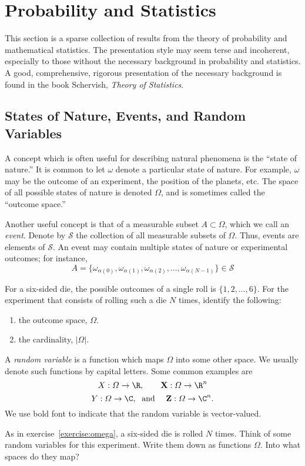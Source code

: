 \section{Probability and Statistics}
This section is a sparse collection of results from the
theory of probability and mathematical statistics.  The
presentation style may seem terse and incoherent, especially
to those without the necessary background in probability and
statistics.  A good, comprehensive, rigorous presentation of
the necessary background is found in the book
\cite{Schervish:1995} Schervish, {\it Theory of Statistics}.

\subsection{States of Nature, Events, and Random Variables}
A concept which is often useful for describing natural phenomena is the
``state of nature.''  It is common to let $\omega$ denote a
particular state of nature.  For example, $\omega$ may be the outcome of an
experiment, the position of the planets, etc.  The space of all possible states
of nature is denoted $\varOmega$, and is sometimes called the ``outcome space.'' 

Another useful concept is that of a measurable subset $A\subset
\varOmega$, which we call an \emph{event}.
Denote by $\mathcal{S}$ the collection of all measurable subsets of
$\varOmega$.  Thus, events are elements of $\mathcal{S}$.  An event may contain
multiple states of nature or experimental outcomes; for instance,
\[
A = \{\omega_{\alpha(0)}, \omega_{\alpha(1)}, \omega_{\alpha(2)}, \ldots,
\omega_{\alpha({N-1})} \} \in \mathcal{S}
\]

\begin{exercise}\label{exercise:omega}
For a six-sided die, the possible outcomes of a single roll is $\{1, 2, \ldots, 6\}$. 
For the experiment that consists of rolling such a die $N$ times, identify the following:
\begin{enumerate}
\item the outcome space, $\varOmega$.
\item the cardinality, $|\varOmega|$.
\end{enumerate}
\end{exercise}

A \emph{random variable} is a function which maps $\varOmega$ into some other
space. We usually denote such functions by capital letters.  Some common
examples are 
\[
X : \varOmega \to \R, \qquad \mathbf{X} : \varOmega \to \R^n
\]
\[
Y : \varOmega \to \C, \; \text{ and } \quad \mathbf{Z} : \varOmega \to \C^n.
\]
We use bold font to indicate that the random variable is vector-valued.
\begin{exercise}\label{exercise:rv}
As in exercise~\ref{exercise:omega}, a six-sided die is rolled $N$
times.  Think of some random variables for this experiment. Write them down as
functions $\varOmega$.  Into what spaces do they map?
\end{exercise}

